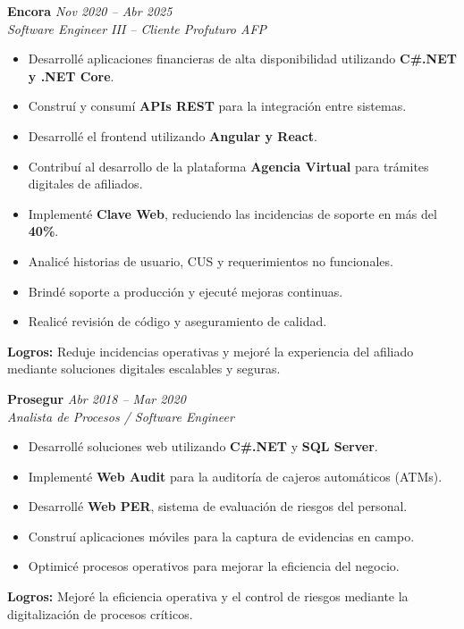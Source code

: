 \documentclass[11pt,a4paper]{article}
\begin{document}
\vspace{6pt}

\textbf{Encora} \hfill \textit{Nov 2020 – Abr 2025}\\
\textit{Software Engineer III – Cliente Profuturo AFP}

\begin{itemize}[leftmargin=*]
  \item Desarrollé aplicaciones financieras de alta disponibilidad utilizando \textbf{C\#.NET y .NET Core}.
  \item Construí y consumí \textbf{APIs REST} para la integración entre sistemas.
  \item Desarrollé el frontend utilizando \textbf{Angular y React}.
  \item Contribuí al desarrollo de la plataforma \textbf{Agencia Virtual} para trámites digitales de afiliados.
  \item Implementé \textbf{Clave Web}, reduciendo las incidencias de soporte en más del \textbf{40\%}.
  \item Analicé historias de usuario, CUS y requerimientos no funcionales.
  \item Brindé soporte a producción y ejecuté mejoras continuas.
  \item Realicé revisión de código y aseguramiento de calidad.
\end{itemize}
\textbf{Logros:} Reduje incidencias operativas y mejoré la experiencia del afiliado mediante soluciones digitales escalables y seguras.

\vspace{9pt}

\textbf{Prosegur} \hfill \textit{Abr 2018 – Mar 2020}\\
\textit{Analista de Procesos / Software Engineer}

\begin{itemize}[leftmargin=*]
  \item Desarrollé soluciones web utilizando \textbf{C\#.NET} y \textbf{SQL Server}.
  \item Implementé \textbf{Web Audit} para la auditoría de cajeros automáticos (ATMs).
  \item Desarrollé \textbf{Web PER}, sistema de evaluación de riesgos del personal.
  \item Construí aplicaciones móviles para la captura de evidencias en campo.
  \item Optimicé procesos operativos para mejorar la eficiencia del negocio.
\end{itemize}
\textbf{Logros:} Mejoré la eficiencia operativa y el control de riesgos mediante la digitalización de procesos críticos.
\end{document}
